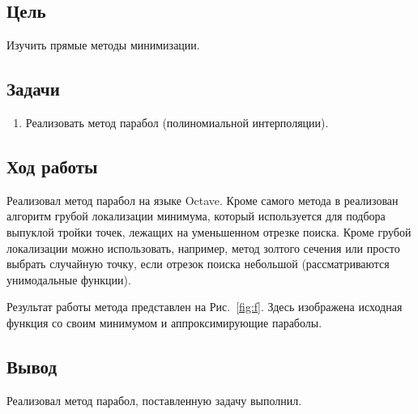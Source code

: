 



\newcommand{\labn}{3}


\subsection*{Цель}

Изучить прямые методы минимизации.

\subsection*{Задачи}

\begin{enumerate}
    \item Реализовать метод парабол (полиномиальной интерполяции).
\end{enumerate}

\subsection*{Ход работы}

Реализовал метод парабол на языке Octave. Кроме самого метода 
в реализован алгоритм грубой локализации минимума, который используется для подбора выпуклой тройки точек, лежащих на 
уменьшенном отрезке поиска. Кроме грубой локализации можно использовать, например, метод золтого сечения или просто выбрать случайную точку, если
отрезок поиска небольшой (рассматриваются унимодальные функции).

Результат работы метода представлен на Рис.~\ref{fig:f}.
Здесь изображена исходная функция со своим минимумом и аппроксимирующие параболы.

\subsection*{Вывод}

Реализовал метод парабол, поставленную задачу выполнил.


